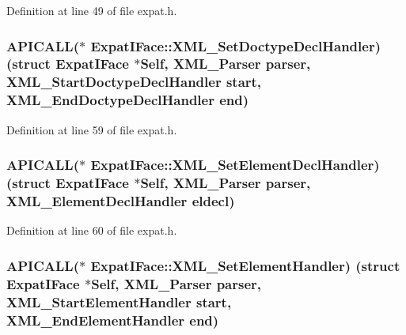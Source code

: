 Definition at line 49 of file expat.\+h.

\subsubsection[{\texorpdfstring{X\+M\+L\+\_\+\+Set\+Doctype\+Decl\+Handler}{XML_SetDoctypeDeclHandler}}]{ A\+P\+I\+C\+A\+LL($\ast$ Expat\+I\+Face\+::\+X\+M\+L\+\_\+\+Set\+Doctype\+Decl\+Handler) (struct {\bf Expat\+I\+Face} $\ast$Self, {\bf X\+M\+L\+\_\+\+Parser} parser, {\bf X\+M\+L\+\_\+\+Start\+Doctype\+Decl\+Handler} {\bf start}, {\bf X\+M\+L\+\_\+\+End\+Doctype\+Decl\+Handler} {\bf end})}\hypertarget{struct_expat_i_face_a1501d21134370300902fe987f7918cef}{}\label{struct_expat_i_face_a1501d21134370300902fe987f7918cef}


Definition at line 59 of file expat.\+h.

\subsubsection[{\texorpdfstring{X\+M\+L\+\_\+\+Set\+Element\+Decl\+Handler}{XML_SetElementDeclHandler}}]{ A\+P\+I\+C\+A\+LL($\ast$ Expat\+I\+Face\+::\+X\+M\+L\+\_\+\+Set\+Element\+Decl\+Handler) (struct {\bf Expat\+I\+Face} $\ast$Self, {\bf X\+M\+L\+\_\+\+Parser} parser, {\bf X\+M\+L\+\_\+\+Element\+Decl\+Handler} eldecl)}\hypertarget{struct_expat_i_face_a54e627642410900f2693396e650a0620}{}\label{struct_expat_i_face_a54e627642410900f2693396e650a0620}


Definition at line 60 of file expat.\+h.

\subsubsection[{\texorpdfstring{X\+M\+L\+\_\+\+Set\+Element\+Handler}{XML_SetElementHandler}}]{ A\+P\+I\+C\+A\+LL($\ast$ Expat\+I\+Face\+::\+X\+M\+L\+\_\+\+Set\+Element\+Handler) (struct {\bf Expat\+I\+Face} $\ast$Self, {\bf X\+M\+L\+\_\+\+Parser} parser, {\bf X\+M\+L\+\_\+\+Start\+Element\+Handler} {\bf start}, {\bf X\+M\+L\+\_\+\+End\+Element\+Handler} {\bf end})}\hypertarget{struct_expat_i_face_aaf701e96f41c85eb3d9bd53701c60747}{}\label{struct_expat_i_face_aaf701e96f41c85eb3d9bd53701c60747}


